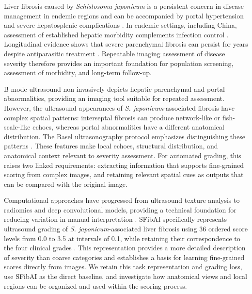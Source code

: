 Liver fibrosis caused by \emph{Schistosoma japonicum} is a persistent concern in disease management in endemic regions and can be accompanied by portal hypertension and severe hepatosplenic complications \citep{colley2014schistosomiasis,mcmanus2018schistosomiasis}. In endemic settings, including China, assessment of established hepatic morbidity complements infection control \citep{mcmanus2010china,lo2022who}. Longitudinal evidence shows that severe parenchymal fibrosis can persist for years despite antiparasitic treatment \citep{carlton2010morbidity}. Repeatable imaging assessment of disease severity therefore provides an important foundation for population screening, assessment of morbidity, and long-term follow-up.

B-mode ultrasound non-invasively depicts hepatic parenchymal and portal abnormalities, providing an imaging tool suitable for repeated assessment. However, the ultrasound appearances of \emph{S. japonicum}-associated fibrosis have complex spatial patterns: interseptal fibrosis can produce network-like or fish-scale-like echoes, whereas portal abnormalities have a different anatomical distribution. The Basel ultrasonography protocol emphasizes distinguishing these patterns \citep{richter2025basel}. These features make local echoes, structural distribution, and anatomical context relevant to severity assessment. For automated grading, this raises two linked requirements: extracting information that supports fine-grained scoring from complex images, and retaining relevant spatial cues as outputs that can be compared with the original image.

Computational approaches have progressed from ultrasound texture analysis to radiomics and deep convolutional models, providing a technical foundation for reducing variation in manual interpretation \citep{yeh2003fibrosis,guo2024radiomics,lee2020ultrasound}. SFibAI specifically represents ultrasound grading of \emph{S. japonicum}-associated liver fibrosis using 36 ordered score levels from 0.0 to 3.5 at intervals of 0.1, while retaining their correspondence to the four clinical grades \citep{xu2026sfibai}. This representation provides a more detailed description of severity than coarse categories and establishes a basis for learning fine-grained scores directly from images. We retain this task representation and grading loss, use SFibAI as the direct baseline, and investigate how anatomical views and local regions can be organized and used within the scoring process.

